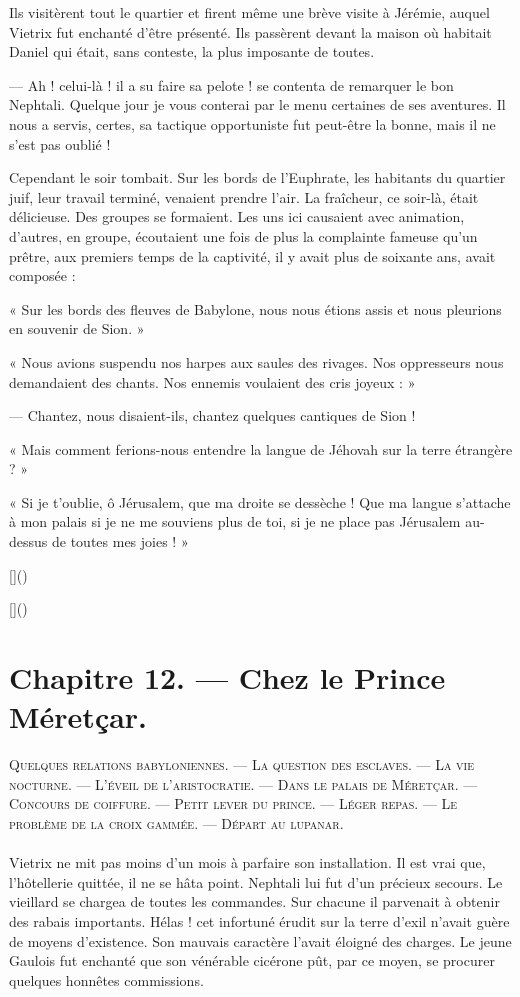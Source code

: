 \documentclass[a4paper, 11pt, oneside, polutonikogreek, french]{article}
\begin{document}
Ils visitèrent tout le quartier et firent même une brève visite à Jérémie, auquel Vietrix fut enchanté d'être présenté. Ils passèrent devant la maison où habitait Daniel qui était, sans conteste, la plus imposante de toutes.

--- Ah ! celui-là ! il a su faire sa pelote ! se contenta de remarquer le bon Nephtali. Quelque jour je vous conterai par le menu certaines de ses aventures. Il nous a servis, certes, sa tactique opportuniste fut peut-être la bonne, mais il ne s'est pas oublié !

Cependant le soir tombait. Sur les bords de l'Euphrate, les habitants du quartier juif, leur travail terminé, venaient prendre l'air. La fraîcheur, ce soir-là, était délicieuse. Des groupes se formaient. Les uns ici causaient avec animation, d'autres, en groupe, écoutaient une fois de plus la complainte fameuse qu'un prêtre, aux premiers temps de la captivité, il y avait plus de soixante ans, avait composée :

« Sur les bords des fleuves de Babylone, nous nous étions assis et nous pleurions en souvenir de Sion. »

« Nous avions suspendu nos harpes aux saules des rivages. Nos oppresseurs nous demandaient des chants. Nos ennemis voulaient des cris joyeux : »

--- Chantez, nous disaient-ils, chantez quelques cantiques de Sion !

« Mais comment ferions-nous entendre la langue de Jéhovah sur la terre étrangère ? »

« Si je t'oublie, ô Jérusalem, que ma droite se dessèche ! Que ma langue s'attache à mon palais si je ne me souviens plus de toi, si je ne place pas Jérusalem au-dessus de toutes mes joies ! »

[]()

[]()
\clearpage
\section{Chapitre 12. --- Chez le Prince Méretçar.}
\begin{center}
\scshape
\small
Quelques relations babyloniennes. --- La question des esclaves. --- La vie nocturne. --- L'éveil de l'aristocratie. --- Dans le palais de Méretçar. --- Concours de coiffure. --- Petit lever du prince. --- Léger repas. --- Le problème de la croix gammée. --- Départ au lupanar.
\end{center}
\paragraph{}
Vietrix ne mit pas moins d'un mois à parfaire son installation. Il est vrai que, l'hôtellerie quittée, il ne se hâta point. Nephtali lui fut d'un précieux secours. Le vieillard se chargea de toutes les commandes. Sur chacune il parvenait à obtenir des rabais importants. Hélas ! cet infortuné érudit sur la terre d'exil n'avait guère de moyens d'existence. Son mauvais caractère l'avait éloigné des charges. Le jeune Gaulois fut enchanté que son vénérable cicérone pût, par ce moyen, se procurer quelques honnêtes commissions.
\end{document}
